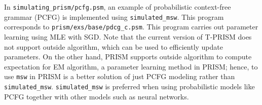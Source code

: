 \documentclass[a4paper]{report}
\begin{document}
In {\tt simulating\_prism/pcfg.psm}, an example of probabilistic context-free grammar (PCFG) is implemented using {\tt simulated\_msw}.
This program corresponds to {\tt prism/exs/base/pdcg\_c.psm}.
This program carries out parameter learning using MLE with SGD. 
Note that the current version of T-PRISM does not support outside algorithm, which can be used to efficiently update parameters.
On the other hand, PRISM supports outside algorithm to compute expectation for EM algorithm, a parameter learning method in PRISM; hence, to use {\tt msw} in PRISM is a better solution of just PCFG modeling rather than {\tt simulated\_msw}.
{\tt simulated\_msw} is preferred when using probabilistic models like PCFG together with other models such as neural networks.
  




\end{document}
